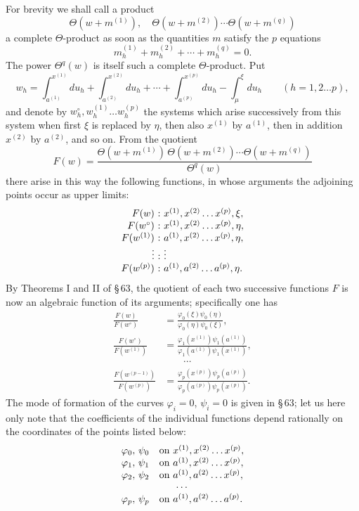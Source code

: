 \documentclass[10pt]{article}
\begin{document}
For brevity we shall call a product
\[
\Theta(w+m^{(1)}),\quad \Theta(w+m^{(2)})\cdots \Theta(w+m^{(q)})
\]
a complete \(\Theta\)-product as soon as the quantities \(m\) satisfy the \(p\) equations
\[
m_h^{(1)}+m_h^{(2)}+\cdots+m_h^{(q)}=0.
\]
The power \(\Theta^q(w)\) is itself such a complete \(\Theta\)-product. Put
\[
w_h=\int_{a^{(1)}}^{x^{(1)}}du_h+
\int_{a^{(2)}}^{x^{(2)}}du_h+\cdots+
\int_{a^{(p)}}^{x^{(p)}}du_h-
\int_{\mu}^{\xi}du_h\qquad(h=1,2\ldots p),
\]
and denote by \(w_h^\circ,w_h^{(1)}\ldots w_h^{(p)}\) the systems which arise successively from this system when first \(\xi\) is replaced by \(\eta\), then also \(x^{(1)}\) by \(a^{(1)}\), then in addition \(x^{(2)}\) by \(a^{(2)}\), and so on. From the quotient
\[
F(w)=\frac{\Theta(w+m^{(1)})\,\Theta(w+m^{(2)})\cdots\Theta(w+m^{(q)})}{\Theta^q(w)}
\]
there arise in this way the following functions, in whose arguments the adjoining points occur as upper limits:
\[
\begin{array}{r@{\ :\ }l}
F(w)&x^{(1)},x^{(2)}\ldots x^{(p)},\xi,\\
F(w^\circ)&x^{(1)},x^{(2)}\ldots x^{(p)},\eta,\\
F(w^{(1)})&a^{(1)},x^{(2)}\ldots x^{(p)},\eta,\\
\vdots&\vdots\\
F(w^{(p)})&a^{(1)},a^{(2)}\ldots a^{(p)},\eta.
\end{array}
\]
By Theorems I and II of \S\,63, the quotient of each two successive functions \(F\) is now an algebraic function of its arguments; specifically one has
\[
\tag{1}
\begin{aligned}
\frac{F(w)}{F(w^\circ)}&=\frac{\varphi_0(\xi)\psi_0(\eta)}{\varphi_0(\eta)\psi_0(\xi)},\\
\frac{F(w^\circ)}{F(w^{(1)})}&=\frac{\varphi_1(x^{(1)})\psi_1(a^{(1)})}{\varphi_1(a^{(1)})\psi_1(x^{(1)})},\\
&\hspace{2em}\cdots\\
\frac{F(w^{(p-1)})}{F(w^{(p)})}&=\frac{\varphi_p(x^{(p)})\psi_p(a^{(p)})}{\varphi_p(a^{(p)})\psi_p(x^{(p)})}.
\end{aligned}
\]
The mode of formation of the curves \(\varphi_i=0\), \(\psi_i=0\) is given in \S\,63; let us here only note that the coefficients of the individual functions depend rationally on the coordinates of the points listed below:
\[
\begin{array}{r@{,\ }l@{\quad}l}
\varphi_0&\psi_0&\text{on }x^{(1)},x^{(2)}\ldots x^{(p)},\\
\varphi_1&\psi_1&\text{on }a^{(1)},x^{(2)}\ldots x^{(p)},\\
\varphi_2&\psi_2&\text{on }a^{(1)},a^{(2)}\ldots x^{(p)},\\
\multicolumn{3}{c}{\cdots}\\
\varphi_p&\psi_p&\text{on }a^{(1)},a^{(2)}\ldots a^{(p)}.
\end{array}
\]
\end{document}
